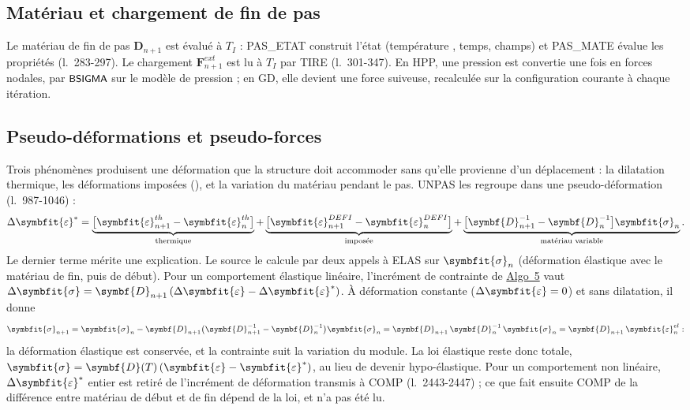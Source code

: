 \documentclass[11pt,a4paper]{article}
\numberwithin{equation}{section}
\newcommand{\src}[1]{\texttt{\detokenize{#1}}}          %
\newcommand{\pr}[1]{\textsf{#1}}                        %
\newcommand{\op}[1]{\textsf{\small #1}}                 %
\newcommand{\lig}[1]{l.~#1}
\newcommand{\vc}[1]{\symbf{#1}}                         %
\newcommand{\eps}{\varepsilon}
\newcommand{\Deps}{\Delta\symbfit{\varepsilon}}
\newcommand{\sig}{\symbfit{\sigma}}
\newcommand{\vg}[1]{\symbfit{#1}}                       %
\newcommand{\algoref}[1]{\hyperref[algo:#1]{Algo~#1}}
\begin{document}
\subsection{Matériau et chargement de fin de pas}

Le matériau de fin de pas $\vc D_{n+1}$ est évalué à $T_I$ : \pr{PAS\_ETAT} construit l'état (température \src{ESTIMATION}, temps, champs) et \pr{PAS\_MATE} évalue les propriétés (\lig{283-297}).
Le chargement $\vc F^{ext}_{n+1}$ est lu à $T_I$ par \op{TIRE} (\lig{301-347}).
En HPP, une pression est convertie une fois en forces nodales, par $\op{BSIGMA}$ sur le modèle de pression ; en GD, elle devient une force suiveuse, recalculée sur la configuration courante à chaque itération.

\subsection{Pseudo-déformations et pseudo-forces}

Trois phénomènes produisent une déformation que la structure doit accommoder sans qu'elle provienne d'un déplacement : la dilatation thermique, les déformations imposées (\src{DEFI}), et la variation du matériau pendant le pas.
\pr{UNPAS} les regroupe dans une pseudo-déformation (\lig{987-1046}) :
\begin{equation}
\label{eq:depsstar}
\Deps^{*} = \underbrace{\big[\vg\eps^{th}_{n+1} - \vg\eps^{th}_n\big]}_{\text{thermique}}
+ \underbrace{\big[\vg\eps^{DEFI}_{n+1} - \vg\eps^{DEFI}_n\big]}_{\text{imposée}}
+ \underbrace{\big[\vc D_{n+1}^{-1} - \vc D_n^{-1}\big]\sig_n}_{\text{matériau variable}} .
\end{equation}
Le dernier terme mérite une explication.
Le source le calcule par deux appels à \op{ELAS} sur $\sig_n$ (déformation élastique avec le matériau de fin, puis de début).
Pour un comportement élastique linéaire, l'incrément de contrainte de \algoref{5} vaut $\Delta\sig = \vc D_{n+1}\,(\Deps - \Deps^{*})$.
À déformation constante ($\Deps = 0$) et sans dilatation, il donne
\begin{equation}
\sig_{n+1} = \sig_n - \vc D_{n+1}\big(\vc D_{n+1}^{-1} - \vc D_n^{-1}\big)\sig_n = \vc D_{n+1}\,\vc D_n^{-1}\,\sig_n = \vc D_{n+1}\,\vg\eps^{el}_n :
\end{equation}
la déformation élastique est conservée, et la contrainte suit la variation du module.
La loi élastique reste donc totale, $\sig = \vc D(T)\,(\vg\eps - \vg\eps^{*})$, au lieu de devenir hypo-élastique.
Pour un comportement non linéaire, $\Deps^{*}$ entier est retiré de l'incrément de déformation transmis à \op{COMP} (\lig{2443-2447}) ; ce que fait ensuite \op{COMP} de la différence entre matériau de début et de fin dépend de la loi, et n'a pas été lu.
\end{document}
